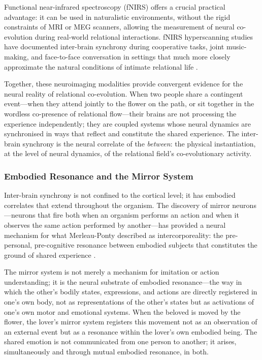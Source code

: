 Functional near-infrared spectroscopy (fNIRS) offers a crucial practical advantage: it can be used in naturalistic environments, without the rigid constraints of MRI or MEG scanners, allowing the measurement of neural co-evolution during real-world relational interactions. fNIRS hyperscanning studies have documented inter-brain synchrony during cooperative tasks, joint music-making, and face-to-face conversation in settings that much more closely approximate the natural conditions of intimate relational life \parencite{hasson2012}.

Together, these neuroimaging modalities provide convergent evidence for the neural reality of relational co-evolution. When two people share a contingent event---when they attend jointly to the flower on the path, or sit together in the wordless co-presence of relational flow---their brains are not processing the experience independently; they are coupled systems whose neural dynamics are synchronised in ways that reflect and constitute the shared experience. The inter-brain synchrony is the neural correlate of the \emph{between}: the physical instantiation, at the level of neural dynamics, of the relational field's co-evolutionary activity.

\subsubsection{Embodied Resonance and the Mirror System}
\label{p14:subsubsec:mirror}

\noindent
Inter-brain synchrony is not confined to the cortical level; it has embodied correlates that extend throughout the organism. The discovery of mirror neurons---neurons that fire both when an organism performs an action and when it observes the same action performed by another---has provided a neural mechanism for what Merleau-Ponty described as intercorporeality: the pre-personal, pre-cognitive resonance between embodied subjects that constitutes the ground of shared experience \parencite{mukamel2010}.

The mirror system is not merely a mechanism for imitation or action understanding; it is the neural substrate of embodied resonance---the way in which the other's bodily states, expressions, and actions are directly registered in one's own body, not as representations of the other's states but as activations of one's own motor and emotional systems. When the beloved is moved by the flower, the lover's mirror system registers this movement not as an observation of an external event but as a resonance within the lover's own embodied being. The shared emotion is not communicated from one person to another; it arises, simultaneously and through mutual embodied resonance, in both.


